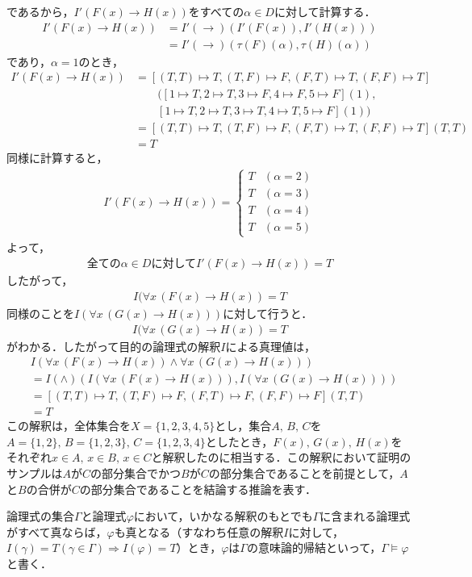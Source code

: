 \documentclass[10pt,b5paper,papersize,dvipdfmx]{jsbook}
\newcommand\fal[1]{\forall#1\,}
\begin{document}
であるから，$I'(F(x)\to H(x))$をすべての$\alpha \in D$に対して計算する．
\begin{align*}
  I'(F(x)\to H(x)) &= I'(\to)(I'(F(x)),I'(H(x)))\\
  &=I'(\to)(\tau(F)(\alpha),\tau(H)(\alpha))
\end{align*}
であり，$\alpha=1$のとき，
\begin{align*}
    I'(F(x)\to H(x))
    &= [(T,T)\mapsto T,(T,F)\mapsto F,(F,T)\mapsto T,(F,F)\mapsto T]\\
      &\qquad ([1\mapsto T,2\mapsto T,3\mapsto F,4\mapsto F,5\mapsto F](1), \\
      &\qquad [1\mapsto T,2\mapsto T,3\mapsto T,4\mapsto T,5\mapsto F](1))\\
    &=[(T,T)\mapsto T,(T,F)\mapsto F,(F,T)\mapsto T,(F,F)\mapsto T](T,T)\\
    &=T
\end{align*}
同様に計算すると，
\begin{align*}
  I'(F(x)\to H(x))=
  \begin{cases}
    T&(\alpha = 2)\\
    T&(\alpha = 3)\\
    T&(\alpha = 4)\\
    T&(\alpha = 5)
  \end{cases}
\end{align*}
よって，
\begin{align*}
  \mbox{全ての}\alpha \in D\mbox{に対して}I'(F(x)\to H(x))=T
\end{align*}
したがって，
\begin{align*}
  I(\fal{x}(F(x)\to H(x))=T
\end{align*}
同様のことを$I(\fal{x}(G(x)\to H(x)))$に対して行うと．
\begin{align*}
  I(\fal{x}(G(x)\to H(x))=T
\end{align*}
がわかる．したがって目的の論理式の解釈$I$による真理値は，
\begin{align*}
  &I(\fal{x}(F(x)\to H(x))\land \fal{x}(G(x)\to H(x)))\\
  &=I(\land)(I(\fal{x}(F(x)\to H(x))),I(\fal{x}(G(x)\to H(x))))\\
  &=[(T,T)\mapsto T,(T,F)\mapsto F,(F,T)\mapsto F,(F,F)\mapsto F](T,T)\\
  &=T
\end{align*}
この解釈は，全体集合を$X=\{1,2,3,4,5\}$とし，集合$A,\, B,\, C$を$A=\{1,2\},\, B=\{1,2,3\},\, C=\{1,2,3,4\}$としたとき，$F(x),\, G(x),\, H(x)$をそれぞれ$x\in A,\, x\in B,\, x\in C$と解釈したのに相当する．この解釈において証明のサンプルは$A$が$C$の部分集合でかつ$B$が$C$の部分集合であることを前提として，$A$と$B$の合併が$C$の部分集合であることを結論する推論を表す．\par
論理式の集合$\Gamma$と論理式$\varphi$において，いかなる解釈のもとでも$\Gamma$に含まれる論理式がすべて真ならば，$\varphi$も真となる（すなわち任意の解釈$I$に対して，$I(\gamma)=T(\gamma \in \Gamma)\Rightarrow I(\varphi)=T$）とき，$\varphi$は$\Gamma$の意味論的帰結といって，$\Gamma \models \varphi$と書く．
\end{document}
